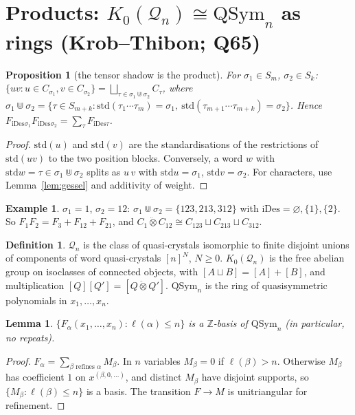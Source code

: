 \documentclass[11pt]{amsart}
\newtheorem{lemma}[theorem]{Lemma}
\newtheorem{proposition}[theorem]{Proposition}
\theoremstyle{definition}
\newtheorem{definition}[theorem]{Definition}
\newtheorem{example}[theorem]{Example}
\theoremstyle{remark}
\newcommand{\qt}{\mathbin{\ddot\otimes}}
\newcommand{\std}{\mathrm{std}}
\newcommand{\iDes}{\mathrm{iDes}}
\newcommand{\QSym}{\mathrm{QSym}}
\newcommand{\cQ}{\mathcal{Q}}
\begin{document}
\section{Products: $K_0(\cQ_n)\cong\QSym_n$ as rings (Krob--Thibon; Q65)}

\begin{proposition}[the tensor shadow is the product]\label{prop:P}
For $\sigma_1\in S_m$, $\sigma_2\in S_k$: $\{uv:u\in C_{\sigma_1},v\in C_{\sigma_2}\}=\bigsqcup_{\tau\in\sigma_1\Cup\sigma_2}C_\tau$, where $\sigma_1\Cup\sigma_2=\{\tau\in S_{m+k}:\std(\tau_1\cdots\tau_m)=\sigma_1,\ \std(\tau_{m+1}\cdots\tau_{m+k})=\sigma_2\}$. Hence $F_{\iDes\sigma_1}F_{\iDes\sigma_2}=\sum_{\tau}F_{\iDes\tau}$.
\end{proposition}
\begin{proof}
$\std(u)$ and $\std(v)$ are the standardisations of the restrictions of $\std(uv)$ to the two position blocks. Conversely, a word $w$ with $\std w=\tau\in\sigma_1\Cup\sigma_2$ splits as $u\,v$ with $\std u=\sigma_1$, $\std v=\sigma_2$. For characters, use Lemma~\ref{lem:gessel} and additivity of weight.
\end{proof}

\begin{example}
$\sigma_1=1$, $\sigma_2=12$: $\sigma_1\Cup\sigma_2=\{123,213,312\}$ with $\iDes=\varnothing,\{1\},\{2\}$. So $F_1F_2=F_3+F_{12}+F_{21}$, and $C_{1}\qt C_{12}\cong C_{123}\sqcup C_{213}\sqcup C_{312}$.
\end{example}

\begin{definition}
$\cQ_n$ is the class of quasi-crystals isomorphic to finite disjoint unions of components of word quasi-crystals $[n]^N$, $N\ge0$. $K_0(\cQ_n)$ is the free abelian group on isoclasses of connected objects, with $[A\sqcup B]=[A]+[B]$, and multiplication $[Q][Q']=[Q\qt Q']$. $\QSym_n$ is the ring of quasisymmetric polynomials in $x_1,\dots,x_n$.
\end{definition}

\begin{lemma}\label{lem:basis}
$\{F_\alpha(x_1,\dots,x_n):\ell(\alpha)\le n\}$ is a $\mathbb Z$-basis of $\QSym_n$ (in particular, no repeats).
\end{lemma}
\begin{proof}
$F_\alpha=\sum_{\beta\text{ refines }\alpha}M_\beta$. In $n$ variables $M_\beta=0$ if $\ell(\beta)>n$. Otherwise $M_\beta$ has coefficient $1$ on $x^{(\beta,0,\dots)}$, and distinct $M_\beta$ have disjoint supports, so $\{M_\beta:\ell(\beta)\le n\}$ is a basis. The transition $F\to M$ is unitriangular for refinement.
\end{proof}
\end{document}
